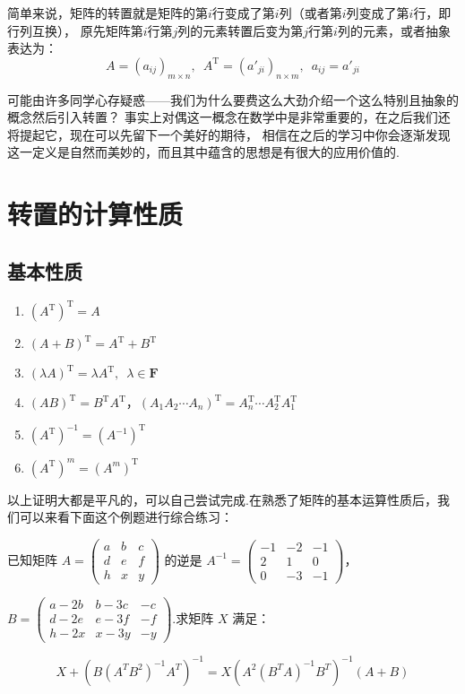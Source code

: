 简单来说，矩阵的转置就是矩阵的第$i$行变成了第$i$列（或者第$i$列变成了第$i$行，即行列互换），
原先矩阵第$i$行第$j$列的元素转置后变为第$j$行第$i$列的元素，或者抽象表达为：
\[A=(a_{ij})_{m \times n},\enspace A^\mathrm{T}=(a'_{ji})_{n \times m},\enspace a_{ij}=a'_{ji}\]


可能由许多同学心存疑惑——我们为什么要费这么大劲介绍一个这么特别且抽象的概念然后引入转置？
事实上对偶这一概念在数学中是非常重要的，在之后我们还将提起它，现在可以先留下一个美好的期待，
相信在之后的学习中你会逐渐发现这一定义是自然而美妙的，而且其中蕴含的思想是有很大的应用价值的.

\section{转置的计算性质}
\subsection{基本性质}
\begin{enumerate}
    \item $(A^\mathrm{T})^\mathrm{T}=A$

    \item $(A+B)^\mathrm{T}=A^\mathrm{T}+B^\mathrm{T}$

    \item $(\lambda A)^\mathrm{T}=\lambda A^\mathrm{T},\enspace \lambda \in \mathbf{F}$

    \item $(AB)^\mathrm{T}=B^\mathrm{T}A^\mathrm{T}$，$(A_1A_2\cdots A_n)^\mathrm{T}=A_n^\mathrm{T}\cdots A_2^\mathrm{T}A_1^\mathrm{T}$

    \item $(A^\mathrm{T})^{-1}=(A^{-1})^\mathrm{T}$

    \item $(A^\mathrm{T})^m=(A^m)^\mathrm{T}$
\end{enumerate}

以上证明大都是平凡的，可以自己尝试完成.在熟悉了矩阵的基本运算性质后，我们可以来看下面这个例题进行综合练习：
\begin{example}
    已知矩阵 $A=\begin{pmatrix}a & b & c \\ d & e & f \\ h & x & y\end{pmatrix}$ 的逆是 $A^{-1}=\begin{pmatrix}-1 & -2 & -1 \\ 2 & 1 & 0 \\ 0 & -3 & -1\end{pmatrix}$，

$B=\begin{pmatrix}a-2b & b-3c & -c \\ d-2e & e-3f & -f \\ h-2x & x-3y & -y\end{pmatrix}$.求矩阵 $X$ 满足：

\[X+\left(B(A^TB^2)^{-1}A^T\right)^{-1}=X\left(A^2(B^TA)^{-1}B^T\right)^{-1}(A+B)\]
\end{example}

